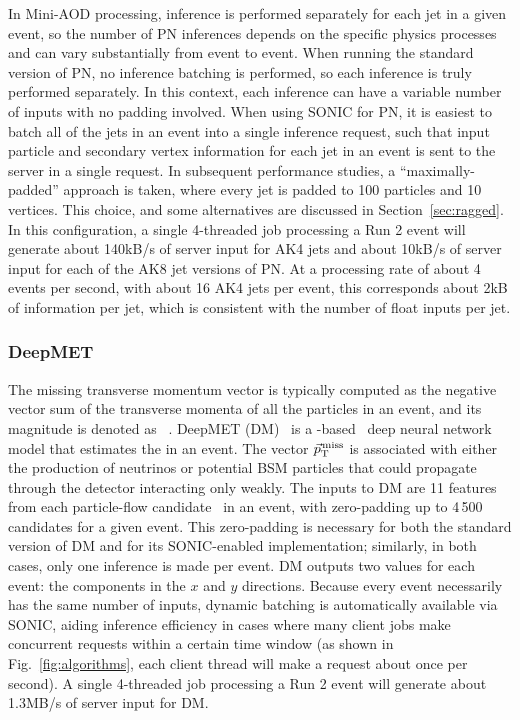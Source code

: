 In Mini-AOD processing, inference is performed separately for each jet in a given event, so the number of PN inferences depends on the specific physics processes and can vary substantially from event to event. When running the standard \CMSSW version of PN, no inference batching is performed, so each inference is truly performed separately. In this context, each inference can have a variable number of inputs with no padding involved. When using SONIC for PN, it is easiest to batch all of the jets in an event into a single inference request, such that input particle and secondary vertex information for each jet in an event is sent to the server in a single request. In subsequent performance studies, a ``maximally-padded'' approach is taken, where every jet is padded to 100 particles and 10 vertices. This choice, and some alternatives are discussed in Section~\ref{sec:ragged}. In this configuration, a single 4-threaded job processing a Run 2 \ttbar event will generate about 140\unit{kB/s} of server input for AK4 jets and about 10\unit{kB/s} of server input for each of the AK8 jet versions of PN. At a processing rate of about 4 events per second, with about 16 AK4 jets per event, this corresponds about 2\unit{kB} of information per jet, which is consistent with the number of float inputs per jet.


\subsubsection{DeepMET}


The missing transverse momentum vector \ptvecmiss is typically computed as the negative vector sum of the transverse momenta of all the particles in an event, and its magnitude is denoted as \ptmiss~\cite{CMS:2019ctu}. DeepMET (DM)~\cite{DeepMET} is a \TENSORFLOW-based~\cite{tensorflow} deep neural network model that estimates the \ptvecmiss in an event. The vector ${\vec p}_{\mathrm{T}}^{\kern1pt\text{miss}}$ is associated with either the production of neutrinos or potential BSM particles that could propagate through the detector interacting only weakly. The inputs to DM are 11 features from each particle-flow candidate~\cite{CMS:2017yfk} in an event, with zero-padding up to 4\,500 candidates for a given event. This zero-padding is necessary for both the standard version of DM and for its SONIC-enabled implementation; similarly, in both cases, only one inference is made per event. DM outputs two values for each event: the \ptvecmiss components in the $x$ and $y$ directions. Because every event necessarily has the same number of inputs, dynamic batching is automatically available via SONIC, aiding inference efficiency in cases where many client jobs make concurrent requests within a certain time window (as shown in Fig.~\ref{fig:algorithms}, each client thread will make a request about once per second). A single 4-threaded job processing a Run 2 \ttbar event will generate about 1.3\unit{MB/s} of server input for DM.

